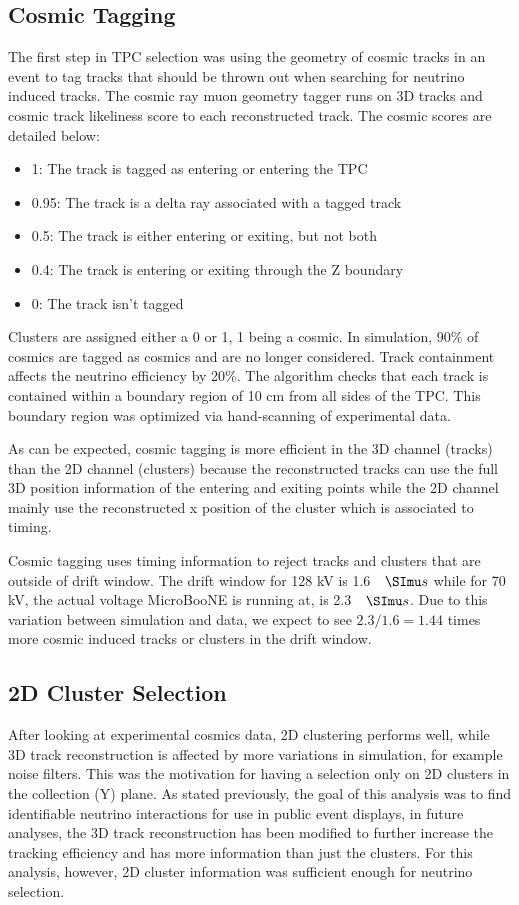 \subsection{Cosmic Tagging}
The first step in TPC selection was using the geometry of cosmic tracks in an event to tag tracks that should be thrown out when searching for neutrino induced tracks. The cosmic ray muon geometry tagger runs on 3D tracks and cosmic track likeliness score to each reconstructed track. The cosmic scores are detailed below:
\begin{itemize}
\item 1: The track is tagged as entering or entering the TPC
\item 0.95: The track is a delta ray associated with a tagged track
\item 0.5: The track is either entering or exiting, but not both
\item 0.4: The track is entering or exiting through the Z boundary
\item 0: The track isn't tagged
\end{itemize}
Clusters are assigned either a 0 or 1, 1 being a cosmic. In simulation, 90\% of cosmics are tagged as cosmics and are no longer considered. Track containment affects the neutrino efficiency by 20\%. The algorithm checks that each track is contained within a boundary region of 10 cm from all sides of the TPC. This boundary region was optimized via hand-scanning of experimental data.

As can be expected, cosmic tagging is more efficient in the 3D channel (tracks) than the 2D channel (clusters) because the reconstructed tracks can use the full 3D position information of the entering and exiting points while the 2D channel mainly use the reconstructed x position of the cluster which is associated to timing. 

Cosmic tagging uses timing information to reject tracks and clusters that are outside of drift window. The drift window for 128 kV is 1.6 $\micro s$ while for 70 kV, the actual voltage MicroBooNE is running at, is 2.3 $\micro s$. Due to this variation between simulation and data, we expect to see $2.3/1.6 = 1.44$ times more cosmic induced tracks or clusters in the drift window. 
\subsection{2D Cluster Selection}
After looking at experimental cosmics data, 2D clustering performs well, while 3D track reconstruction is affected by more variations in simulation, for example noise filters. This was the motivation for having a selection only on 2D clusters in the collection (Y) plane. As stated previously, the goal of this analysis was to find identifiable neutrino interactions for use in public event displays, in future analyses, the 3D track reconstruction has been modified to further increase the tracking efficiency and has more information than just the clusters. For this analysis, however, 2D cluster information was sufficient enough for neutrino selection. 
